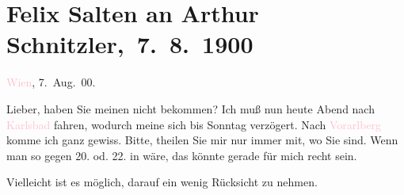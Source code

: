

\renewcommand{\erwaehnteOrte}{Orte: Bad Ischl, Karlsbad, Pressbaum, Schruns, Vorarlberg, Wien}
\renewcommand{\erwaehnteWerke}{}
\section[ Felix Salten an Arthur Schnitzler, 7. 8. 1900]{Felix Salten an Arthur Schnitzler, 7. 8. 1900}
\nopagebreak{}
\rehead{ }\normalsize\beginnumbering{}
\toendnotes[C]{\smallbreak\pagebreak[2]}
\toendnotes[C]{\smallbreak}
\pstart
           \raggedleft{}{\pb}\textcolor{pink}{Wien}{}\ledrightnote{\textcolor{pink}{Wien}}, 7. Aug. 00.\pend
           
\pstart
           Lieber, haben Sie meinen \label{K_L03308-1v}\label{K_L03308-1h} nicht bekommen? Ich muß nun heute{ }Abend nach \textcolor{pink}{Karlsbad}{}\ledrightnote{\textcolor{pink}{Karlsbad}} fahren, wodurch
               meine \label{K_L03308-2v}\label{K_L03308-2h} sich bis Sonntag
               verzögert. Nach \textcolor{pink}{Vorarlberg}{}\ledrightnote{\textcolor{pink}{Vorarlberg}} komme ich ganz
               gewiss. Bitte, theilen Sie mir nur immer mit, wo Sie sind. Wenn man so gegen 20. od. 22. in \label{K_L03308-3v}\label{K_L03308-3h} wäre, das könnte gerade für mich recht sein.\pend
           
\pstart
           Vielleicht ist es möglich, darauf ein wenig Rücksicht zu nehmen.\pend
           
